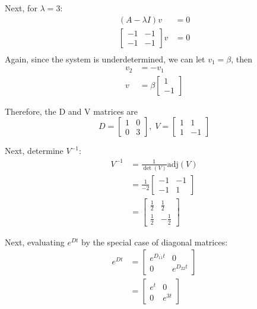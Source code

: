 Next, for $\lambda = 3$:
\[
    \begin{aligned}
        (A - \lambda I) v &= 0 \\
        \begin{bmatrix}
            -1 & -1 \\
            -1 & -1
        \end{bmatrix} v &= 0 \\
    \end{aligned}
\]
Again, since the system is underdetermined, we can let $v_1 = \beta$, then
\[
    \begin{aligned}
        v_2 &= -v_1 \\
        v &= \beta
        \begin{bmatrix}
            1 \\
            -1
        \end{bmatrix}
    \end{aligned}
\]

Therefore, the D and V matrices are
\[
    D = 
    \begin{bmatrix}
        1 & 0 \\
        0 & 3
    \end{bmatrix}
    , \;
    V = 
    \begin{bmatrix}
        1 & 1 \\
        1 & -1
    \end{bmatrix}
\]

Next, determine $V^{-1}$:
\[
    \begin{aligned}
        V^{-1} &= \frac{1}{\det(V)} \text{adj}(V) \\
        &= \frac{1}{-2} 
        \begin{bmatrix}
            -1 & -1 \\
            -1 & 1
        \end{bmatrix} \\
        &= 
        \begin{bmatrix}
            \frac{1}{2} & \frac{1}{2} \\
            \frac{1}{2} & -\frac{1}{2}
        \end{bmatrix}
    \end{aligned}
\]

Next, evaluating $e^{Dt}$ by the special case of diagonal matrices:
\[
    \begin{aligned}
        e^{Dt} &= 
        \begin{bmatrix}
            e^{D_{11}t} & 0 \\
            0 & e^{D_{22}t}
        \end{bmatrix} \\
        &= 
        \begin{bmatrix}
            e^t & 0 \\
            0 & e^{3t}
        \end{bmatrix}
    \end{aligned}
\]

